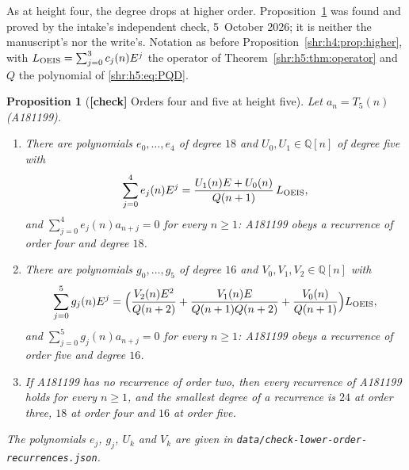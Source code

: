 \documentclass[11pt,letterpaper]{article}
\numberwithin{equation}{section}
\newtheorem{proposition}[theorem]{Proposition}
\theoremstyle{definition}
\newcommand{\Q}{\mathbb Q}
\newcommand{\1}{\mathbf 1}
\begin{document}
As at height four, the degree drops at higher order.
Proposition~\ref{shr:h5:prop:higher} was found and proved by the intake's
independent check, 5~October 2026; it is neither the manuscript's nor the
write's. Notation as before Proposition~\ref{shr:h4:prop:higher}, with
$L_{\rm OEIS}=\sum_{j=0}^3c_j(n)E^j$ the operator of
Theorem~\ref{shr:h5:thm:operator} and $Q$ the polynomial of
\eqref{shr:h5:eq:PQD}.

\begin{proposition}[\textbf{[check]} Orders four and five at height five]
\label{shr:h5:prop:higher}
Let $a_n=T_5(n)$ (A181199).
\begin{enumerate}[label=(\alph*),leftmargin=*]
\item There are polynomials $e_0,\ldots,e_4$ of degree $18$ and
$U_0,U_1\in\Q[n]$ of degree five with
\[
 \sum_{j=0}^4e_j(n)E^j=\frac{U_1(n)E+U_0(n)}{Q(n+1)}\,L_{\rm OEIS},
\]
and $\sum_{j=0}^4e_j(n)a_{n+j}=0$ for every $n\ge1$: A181199 obeys a
recurrence of order four and degree $18$.
\item There are polynomials $g_0,\ldots,g_5$ of degree $16$ and
$V_0,V_1,V_2\in\Q[n]$ with
\[
 \sum_{j=0}^5g_j(n)E^j=\Bigl(\frac{V_2(n)E^2}{Q(n+2)}
 +\frac{V_1(n)E}{Q(n+1)Q(n+2)}+\frac{V_0(n)}{Q(n+1)}\Bigr)L_{\rm OEIS},
\]
and $\sum_{j=0}^5g_j(n)a_{n+j}=0$ for every $n\ge1$: A181199 obeys a
recurrence of order five and degree $16$.
\item If A181199 has no recurrence of order two, then every recurrence of
A181199 holds for every $n\ge1$, and the smallest degree of a recurrence is
$24$ at order three, $18$ at order four and $16$ at order five.
\end{enumerate}
The polynomials $e_j$, $g_j$, $U_k$ and $V_k$ are given in
\texttt{data/\allowbreak check-\allowbreak lower-\allowbreak order-\allowbreak recurrences.\allowbreak json}.
\end{proposition}
\end{document}
